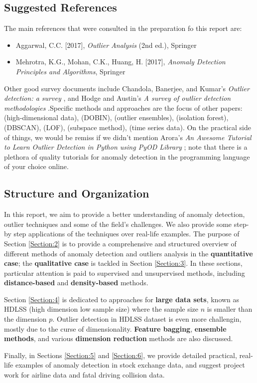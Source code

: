 \subsection{Suggested References}
The main references that were consulted in the preparation fo this report are: 
\begin{itemize}[noitemsep]
\item Aggarwal, C.C. [2017], \textit{Outlier Analysis} (2nd ed.), Springer \cite{A1}
\item Mehrotra, K.G., Mohan, C.K., Huang, H. [2017], \textit{Ano\-ma\-ly Detection Principles and Algorithms}, Springer \cite{A10}
\end{itemize}
Other good survey documents include Chandola, Banerjee, and Kumar's \textit{Outlier detection: a survey} \cite{DP_CBK}, and Hodge and Austin's \textit{A survey of outlier detection methodologies} \cite{DP_HA}.\newl  Specific methods and approaches are the focus of other papers: \cite{AYU,A7,M2} (high-dimensional data), \cite{A6} (DOBIN), \cite{A8} (outlier ensembles), \cite{A15,EIF} (isolation forest), \cite{DBSCAN,HDBSCAN}   (DBSCAN),  \cite{LOF} (LOF), \cite{Zhang,Zi,M1,M3,M4} (subspace method), \cite{chenliu} (time series data). 
\newl On the practical side of things, we would be remiss if we didn't mention Arora's \textit{An Awesome Tutorial to Learn Outlier Detection in Python using PyOD Library} \cite{A11}; note that there is a plethora of quality tutorials for anomaly detection in the programming language of your choice online.
\newpage
\subsection{Structure and Organization}
In this report, we aim to provide a better understanding of anomaly detection, outlier techniques and some of the field's challenges. We also provide some step-by step applications of the techniques over real-life examples.
\newl The purpose of Section \ref{Section:2} is to provide a comprehensive and structured overview of different methods of anomaly detection and outliers analysis in the \textbf{quantitative case}; the \textbf{qualitative case} is tackled in Section \ref{Section:3}. In these sections, particular attention is paid to supervised and unsupervised methods, including \textbf{distance-based} and \textbf{density-based} methods. \par Section \ref{Section:4} is dedicated to approaches for \textbf{large data sets}, known as HDLSS (high dimension low sample size) where the sample size $n$ is smaller than the dimension $p$. Outlier detection in HDLSS dataset is even more challengin, mostly due to the curse of dimensionality. \textbf{Feature bagging}, \textbf{ensemble methods}, and various \textbf{dimension reduction} methods are also discussed. \par  Finally, in Sections \ref{Section:5} and \ref{Section:6}, we provide detailed practical, real-life examples of anomaly detection in stock exchange data, and suggest project work for airline data and fatal driving collision data.
